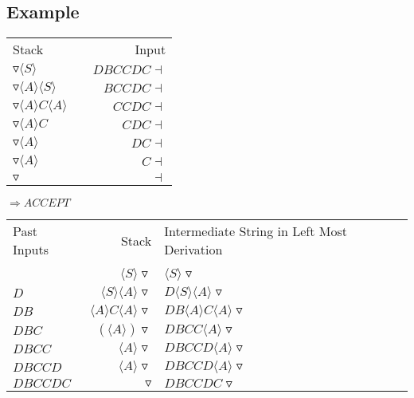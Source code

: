 \documentclass[a4paper,12pt]{article}
\newcommand{\nonterminal}[1]{\langle #1 \rangle}
\begin{document}
\subsection*{Example}

\begin{tabular}{lcr}
Stack													&	\hspace{15mm}	&	Input				\\
$\triangledown \nonterminal{S}$				&						& $DBCCDC\dashv$	\\
$\triangledown \nonterminal{A} \nonterminal{S}$		&			& $BCCDC\dashv$	\\
$\triangledown \nonterminal{A} C \nonterminal{A}$	&			& $CCDC\dashv$	\\
$\triangledown \nonterminal{A} C$			&						& $CDC\dashv$	\\
$\triangledown \nonterminal{A}$				&						& $DC\dashv$	\\
$\triangledown \nonterminal{A}$				&						& $C\dashv$	\\
$\triangledown$									&						& $\dashv$	\\
\end{tabular}

$\Rightarrow ACCEPT$

\begin{tabular}{l|r|l}
Past Inputs			&	Stack		&	Intermediate String in Left Most Derivation	\\
						&				&																\\
						&	$\nonterminal{S} \triangledown$	& $\nonterminal{S} \triangledown$	\\
$D$					&	$\nonterminal{S} \nonterminal{A}\triangledown$	&	$D \nonterminal{S} \nonterminal{A}\triangledown$		\\	
$DB$					&	$\nonterminal{A} C \nonterminal{A} \triangledown$	&	$DB \nonterminal{A} C \nonterminal{A}\triangledown$ \\
$DBC$					&	$\left( \nonterminal{A} \right) \triangledown$	&	$DBCC \nonterminal{A}\triangledown$						\\
$DBCC$				&	$\nonterminal{A} \triangledown$	&	$DBCCD \nonterminal{A}\triangledown$						\\
$DBCCD$				&	$\nonterminal{A} \triangledown$	&	$DBCCD \nonterminal{A}\triangledown$	\\
$DBCCDC$				&	$\triangledown$	&	$DBCCDC\triangledown$			\\
\end{tabular}
\end{document}

